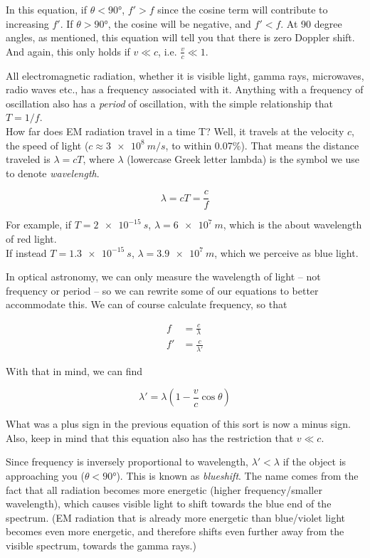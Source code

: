 In this equation, if $\theta < \ang{90}$, $f' > f$ since the cosine term will contribute to increasing $f'$. If $\theta > \ang{90}$, the cosine will be negative, and $f' < f$. At 90 degree angles, as mentioned, this equation will tell you that there is zero Doppler shift. And again, this only holds if $v \ll c$, i.e. $\displaystyle \frac{v}{c} \ll 1$.

All electromagnetic radiation, whether it is visible light, gamma rays, microwaves, radio waves etc., has a frequency associated with it. Anything with a frequency of oscillation also has a \emph{period} of oscillation, with the simple relationship that $T = 1/f$.\\
How far does EM radiation travel in a time T? Well, it travels at the velocity $c$, the speed of light ($c \approx \SI{3e8}{m/s}$, to within 0.07\%). That means the distance traveled is $\lambda = c T$, where $\lambda$ (lowercase Greek letter lambda) is the symbol we use to denote \emph{wavelength}.

\begin{equation}
\lambda = c T = \frac{c}{f}
\end{equation}

For example, if $T = \SI{2e-15}{s}$, $\lambda = \SI{6e7}{m}$, which is the about wavelength of red light.\\
If instead $T = \SI{1.3e-15}{s}$, $\lambda = \SI{3.9e7}{m}$, which we perceive as blue light.

In optical astronomy, we can only measure the wavelength of light -- not frequency or period -- so we can rewrite some of our equations to better accommodate this. We can of course calculate frequency, so that

\begin{align}
f  &= \frac{c}{\lambda}\\
f' &= \frac{c}{\lambda'}
\end{align}

With that in mind, we can find

\begin{equation}
\lambda' = \lambda(1 - \frac{v}{c} \cos \theta)
\end{equation}

What was a plus sign in the previous equation of this sort is now a minus sign. Also, keep in mind that this equation also has the restriction that $v \ll c$.

Since frequency is inversely proportional to wavelength, $\lambda' < \lambda$ if the object is approaching you ($\theta < \ang{90}$). This is known as \emph{blueshift}. The name comes from the fact that all radiation becomes more energetic (higher frequency/smaller wavelength), which causes visible light to shift towards the blue end of the spectrum. (EM radiation that is already more energetic than blue/violet light becomes even more energetic, and therefore shifts even further away from the visible spectrum, towards the gamma rays.)

